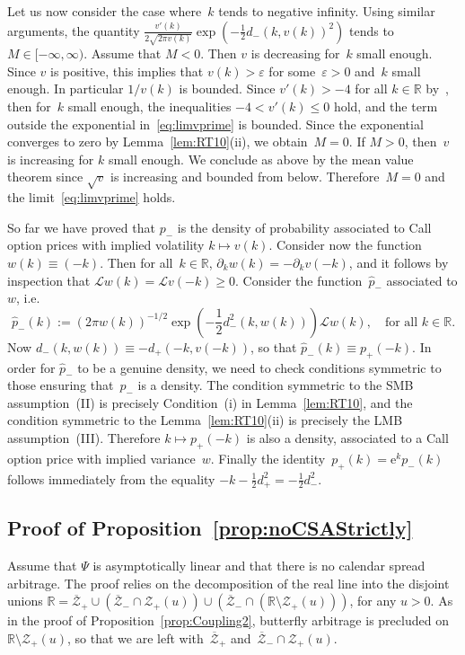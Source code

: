 \documentclass{amsart}[11pt]
\numberwithin{equation}{section}
\theoremstyle{definition}
\newcommand{\RR}{\mathbb{R}}
\newcommand{\Ll}{\mathcal{L}}
\newcommand{\E}{\mathrm{e}}
\newcommand{\Zz}{\mathcal{Z}}
\begin{document}
Let us now consider the case where~$k$ tends to negative infinity. 
Using similar arguments, the quantity $\frac{v'(k)}{2\sqrt{2 \pi v(k)}}\exp\left(-\frac{1}{2}d_-(k,v(k))^2\right)$ 
tends to~$M\in [-\infty,\infty)$.
Assume that $M<0$. 
Then $v$ is decreasing for~$k$ small enough. 
Since $v$ is positive, this implies that $v(k)>\varepsilon$ for some~$\varepsilon>0$ and~$k$ small enough.
In particular $1/v(k)$ is bounded. 
Since $v'(k)>-4$ for all $k\in\RR$ by~\cite[Theorem 5.1]{RT10}, then for~$k$ small enough, 
the inequalities $-4< v'(k)\leq 0$ hold, and the term outside the exponential in~\eqref{eq:limvprime} is bounded. 
Since the exponential converges to zero by Lemma~\ref{lem:RT10}(ii), we obtain~$M=0$.
If $M>0$, then~$v$ is increasing for $k$ small enough. 
We conclude as above by the mean value theorem since $\sqrt{v}$ is increasing and bounded from below.
Therefore~$M=0$ and the limit~\eqref{eq:limvprime} holds.

So far we have proved that $p_-$ is the density of probability associated to Call option prices with implied volatility $k\mapsto v(k)$.
Consider now the function $w(k)\equiv(-k)$. 
Then for all~$k\in\RR$, $\partial_kw(k)=-\partial_kv(-k)$, and it follows by inspection that
$\Ll w(k)=\Ll v(-k)\geq 0$.
Consider the function~$\widehat{p}_-$ associated to $w$, i.e.
$$
\widehat{p}_-(k) := \left(2 \pi w(k)\right)^{-1/2}\exp\left(- \frac{1}{2}d_{-}^2(k,w(k))\right) \Ll w(k),
\quad\text{for all }k\in\RR.
$$
Now $d_{-}(k,w(k)) \equiv -d_{+}(-k,v(-k))$,
so that $\widehat{p}_-(k) \equiv p_+(-k)$.
In order for $\widehat{p}_-$ to be a genuine density, 
we need to check conditions symmetric to those ensuring that~$p_-$ is a density.
The condition symmetric to the SMB assumption~(II) is precisely Condition~(i) in Lemma~\ref{lem:RT10},
and the condition symmetric to the Lemma~\ref{lem:RT10}(ii) is precisely the LMB assumption~(III).
Therefore $k\mapsto p_+(-k)$ is also a density, associated to a Call option price with implied variance~$w$.
Finally the identity~$p_+(k) = \E^{k} p_-(k)$ follows immediately from the equality
$-k-\frac{1}{2}d_+^2=-\frac{1}{2}d_-^2$.


\subsection{Proof of Proposition~\ref{prop:noCSAStrictly}}\label{sec:prop:noCSAStrictly}
Assume that $\Psi$ is asymptotically linear and that there is no calendar spread arbitrage.
The proof relies on the decomposition of the real line into the disjoint unions
$\RR = \overline{\Zz}_+ \cup \left(\overline{\Zz}_-\cap \Zz_+(u)\right) \cup \left(\overline{\Zz}_-\cap (\RR\setminus \Zz_+(u))\right)$, for any $u>0$.
As in the proof of Proposition~\ref{prop:Coupling2}, butterfly arbitrage is precluded on $\RR\setminus \Zz_+(u)$, 
so that we are left with~$\overline{\Zz}_+$ and~$\overline{\Zz}_-\cap \Zz_+(u)$.
\end{document}

